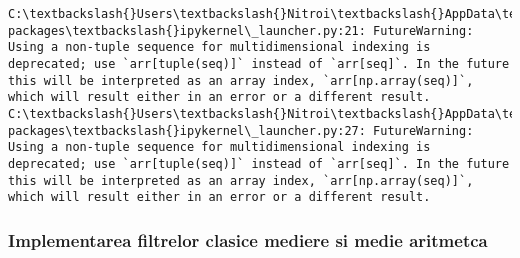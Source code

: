 \documentclass[11pt]{article}
\begin{document}
    \begin{Verbatim}[commandchars=\\\{\}]
C:\textbackslash{}Users\textbackslash{}Nitroi\textbackslash{}AppData\textbackslash{}Local\textbackslash{}Continuum\textbackslash{}anaconda3\textbackslash{}envs\textbackslash{}PAIC\textbackslash{}lib\textbackslash{}site-packages\textbackslash{}ipykernel\_launcher.py:21: FutureWarning: Using a non-tuple sequence for multidimensional indexing is deprecated; use `arr[tuple(seq)]` instead of `arr[seq]`. In the future this will be interpreted as an array index, `arr[np.array(seq)]`, which will result either in an error or a different result.
C:\textbackslash{}Users\textbackslash{}Nitroi\textbackslash{}AppData\textbackslash{}Local\textbackslash{}Continuum\textbackslash{}anaconda3\textbackslash{}envs\textbackslash{}PAIC\textbackslash{}lib\textbackslash{}site-packages\textbackslash{}ipykernel\_launcher.py:27: FutureWarning: Using a non-tuple sequence for multidimensional indexing is deprecated; use `arr[tuple(seq)]` instead of `arr[seq]`. In the future this will be interpreted as an array index, `arr[np.array(seq)]`, which will result either in an error or a different result.

    \end{Verbatim}

    \subsubsection{Implementarea filtrelor clasice mediere si medie
aritmetca}\label{implementarea-filtrelor-clasice-mediere-si-medie-aritmetca}
\end{document}
